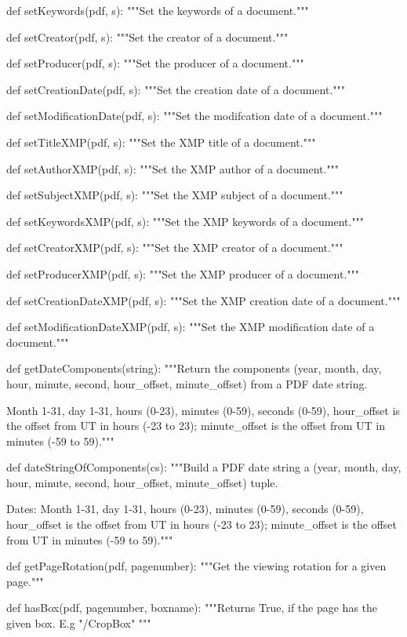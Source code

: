 def setKeywords(pdf, s):
    """Set the keywords of a document."""

def setCreator(pdf, s):
    """Set the creator of a document."""

def setProducer(pdf, s):
    """Set the producer of a document."""

def setCreationDate(pdf, s):
    """Set the creation date of a document."""

def setModificationDate(pdf, s):
    """Set the modifcation date of a document."""

def setTitleXMP(pdf, s):
    """Set the XMP title of a document."""

def setAuthorXMP(pdf, s):
    """Set the XMP author of a document."""

def setSubjectXMP(pdf, s):
    """Set the XMP subject of a document."""

def setKeywordsXMP(pdf, s):
    """Set the XMP keywords of a document."""

def setCreatorXMP(pdf, s):
    """Set the XMP creator of a document."""

def setProducerXMP(pdf, s):
    """Set the XMP producer of a document."""

def setCreationDateXMP(pdf, s):
    """Set the XMP creation date of a document."""

def setModificationDateXMP(pdf, s):
    """Set the XMP modification date of a document."""

def getDateComponents(string):
    """Return the components (year, month, day, hour, minute, second,
    hour_offset, minute_offset) from a PDF date string.

    Month 1-31, day 1-31, hours (0-23), minutes (0-59), seconds
    (0-59), hour_offset is the offset from UT in hours (-23 to 23);
    minute_offset is the offset from UT in minutes (-59 to 59)."""

def dateStringOfComponents(cs):
    """Build a PDF date string a (year, month, day, hour, minute, second,
    hour_offset, minute_offset) tuple.

    Dates: Month 1-31, day 1-31, hours (0-23), minutes (0-59), seconds
    (0-59), hour_offset is the offset from UT in hours (-23 to 23);
    minute_offset is the offset from UT in minutes (-59 to 59)."""

def getPageRotation(pdf, pagenumber):
    """Get the viewing rotation for a given page."""

def hasBox(pdf, pagenumber, boxname):
    """Returns True, if the page has the given box. E.g "/CropBox" """

